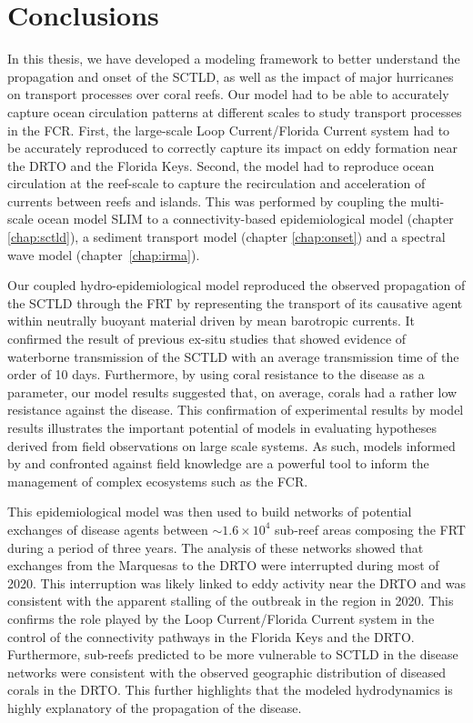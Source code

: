 \section{Conclusions}
In this thesis, we have developed a modeling framework to better understand the propagation and onset of the SCTLD, as well as the impact of major hurricanes on transport processes over coral reefs. Our model had to be able to accurately capture ocean circulation patterns at different scales to study transport processes in the FCR. First, the large-scale Loop Current/Florida Current system had to be accurately reproduced to correctly capture its impact on eddy formation near the DRTO and the Florida Keys. Second, the model had to reproduce ocean circulation at the reef-scale to capture the recirculation and acceleration of currents between reefs and islands. This was performed by coupling the multi-scale ocean model SLIM to a connectivity-based epidemiological model (chapter \ref{chap:sctld}), a sediment transport model (chapter \ref{chap:onset}) and a spectral wave model (chapter~\ref{chap:irma}).

Our coupled hydro-epidemiological model reproduced the observed propagation of the SCTLD through the FRT by representing the transport of its causative agent within neutrally buoyant material driven by mean barotropic currents. It confirmed the result of previous ex-situ studies that showed evidence of waterborne transmission of the SCTLD with an average transmission time of the order of 10 days. Furthermore, by using coral resistance to the disease as a parameter, our model results suggested that, on average, corals had a rather low resistance against the disease. This confirmation of experimental results by model results illustrates the important potential of models in evaluating hypotheses derived from field observations on large scale systems. As such, models informed by and confronted against field knowledge \citep{foster2012connectivity} are a powerful tool to inform the management of complex ecosystems such as the FCR.

This epidemiological model was then used to build networks of potential exchanges of disease agents between $\sim 1.6\times10^4$ sub-reef areas composing the FRT during a period of three years. The analysis of these networks showed that exchanges from the Marquesas to the DRTO were interrupted during most of 2020. This interruption was likely linked to eddy activity near the DRTO and was consistent with the apparent stalling of the outbreak in the region in 2020. This confirms the role played by the Loop Current/Florida Current system in the control of the connectivity pathways in the Florida Keys and the DRTO. Furthermore, sub-reefs predicted to be more vulnerable to SCTLD in the disease networks were consistent with the observed geographic distribution of diseased corals in the DRTO. This further highlights that the modeled hydrodynamics is highly explanatory of the propagation of the disease.

